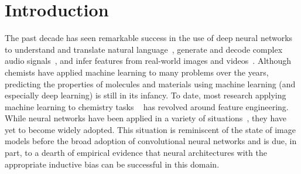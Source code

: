 \documentclass{article}
\begin{document}
\section{Introduction}

The past decade has seen remarkable success in the use of deep neural networks to understand and translate natural language~\cite{wu2016google}, generate and decode complex audio signals~\cite{hinton2012deep}, and infer features from real-world images and videos~\cite{krizhevsky2012imagenet}. Although chemists have applied machine learning to many problems over the years, predicting the properties of molecules and materials using machine learning (and especially deep learning) is still in its infancy. To date, most research applying machine learning to chemistry tasks ~\cite{bob,BAML,coloumb,rogers2010extended,montavon2012learning,behler2007,schoenholz2016}  has revolved around feature engineering. While neural networks have been applied in a variety of situations~\cite{merkwirth2005automatic, micheli2009neural, lusci2013deep, duvenaud2015}, they have yet to become widely adopted. This situation is reminiscent of the state of image models before the broad adoption of convolutional neural networks and is due, in part, to a dearth of empirical evidence that neural architectures with the appropriate inductive bias can be successful in this domain. 
\end{document}
